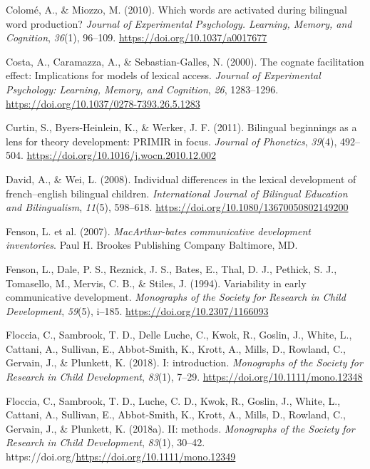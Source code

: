 \documentclass[
  man,
  floatsintext,
  colorlinks=true,linkcolor=blue,citecolor=blue,urlcolor=blue,biblatex]{apa7}
\newlength{\cslhangindent}
\newlength{\cslentryspacingunit} %
\newenvironment{CSLReferences}[2] %
 {%
  \setlength{\parindent}{0pt}
  \ifodd #1
  \let\oldpar\par
  \def\par{\hangindent=\cslhangindent\oldpar}
  \fi
  \setlength{\parskip}{#2\cslentryspacingunit}
 }%
 {}
\begin{document}
\begin{CSLReferences}{1}{0}
\leavevmode{}%
Colomé, A., \& Miozzo, M. (2010). Which words are activated during
bilingual word production? \emph{Journal of Experimental Psychology.
Learning, Memory, and Cognition}, \emph{36}(1), 96--109.
\url{https://doi.org/10.1037/a0017677}

\leavevmode{}%
Costa, A., Caramazza, A., \& Sebastian-Galles, N. (2000). The cognate
facilitation effect: Implications for models of lexical access.
\emph{Journal of Experimental Psychology: Learning, Memory, and
Cognition}, \emph{26}, 1283--1296.
\url{https://doi.org/10.1037/0278-7393.26.5.1283}

\leavevmode{}%
Curtin, S., Byers-Heinlein, K., \& Werker, J. F. (2011). Bilingual
beginnings as a lens for theory development: {PRIMIR} in focus.
\emph{Journal of Phonetics}, \emph{39}(4), 492--504.
\url{https://doi.org/10.1016/j.wocn.2010.12.002}

\leavevmode{}%
David, A., \& Wei, L. (2008). Individual differences in the lexical
development of french--english bilingual children. \emph{International
Journal of Bilingual Education and Bilingualism}, \emph{11}(5),
598--618. \url{https://doi.org/10.1080/13670050802149200}

\leavevmode{}%
Fenson, L. et al. (2007). \emph{{MacArthur}-bates communicative
development inventories}. Paul H. Brookes Publishing Company Baltimore,
{MD}.

\leavevmode{}%
Fenson, L., Dale, P. S., Reznick, J. S., Bates, E., Thal, D. J.,
Pethick, S. J., Tomasello, M., Mervis, C. B., \& Stiles, J. (1994).
Variability in early communicative development. \emph{Monographs of the
Society for Research in Child Development}, \emph{59}(5), i--185.
\url{https://doi.org/10.2307/1166093}

\leavevmode{}%
Floccia, C., Sambrook, T. D., Delle Luche, C., Kwok, R., Goslin, J.,
White, L., Cattani, A., Sullivan, E., Abbot‐Smith, K., Krott, A., Mills,
D., Rowland, C., Gervain, J., \& Plunkett, K. (2018). I: introduction.
\emph{Monographs of the Society for Research in Child Development},
\emph{83}(1), 7--29. \url{https://doi.org/10.1111/mono.12348}

\leavevmode{}%
Floccia, C., Sambrook, T. D., Luche, C. D., Kwok, R., Goslin, J., White,
L., Cattani, A., Sullivan, E., Abbot‐Smith, K., Krott, A., Mills, D.,
Rowland, C., Gervain, J., \& Plunkett, K. (2018a). {II}: methods.
\emph{Monographs of the Society for Research in Child Development},
\emph{83}(1), 30--42.
https://doi.org/\url{https://doi.org/10.1111/mono.12349}


\end{CSLReferences}
\end{document}
